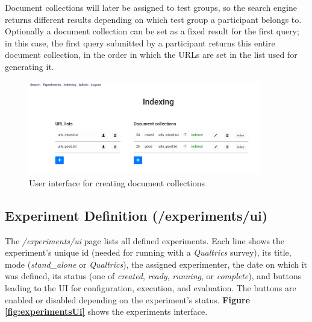 \documentclass[fleqn]{article}
\begin{document}
Document collections will later be assigned 
to test groups, so the search engine returns different results depending on which test group a participant belongs to. Optionally
a document collection can be set as a fixed result for the first query; in this case, the first query submitted by a
participant returns this entire document collection, in the order in which the URLs are set in the list used for generating it.

\begin{figure} [h]
\centering
\includegraphics[width=0.9\textwidth]{img/indexingUi}
\caption{User interface for creating document collections}
\label{fig:indexingUi}
\end{figure}

\newpage


\subsection{Experiment Definition \small{(/experiments/ui)}}

The \emph{/experiments/ui} page lists all defined experiments. Each line shows the experiment's unique id (needed for running
with a \emph{Qualtrics} survey), its title, mode (\emph{stand\_alone} or \emph{Qualtrics}), the assigned experimenter, the date on which it was defined, 
its status (one of \emph{created}, \emph{ready}, \emph{running}, or \emph{complete}), and buttons leading to the UI for configuration,
execution, and evaluation. The buttons are enabled or disabled depending on the experiment's status. \textbf{Figure \ref{fig:experimentsUi}}
shows the experiments interface.
\end{document}
